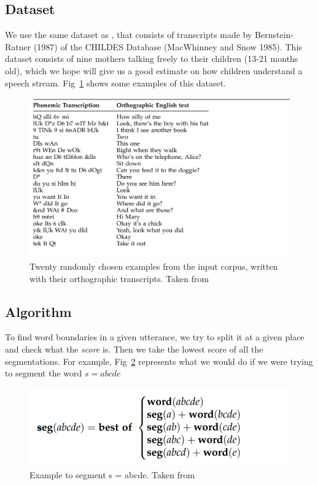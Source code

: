 \documentclass{article}
\begin{document}
\subsection{Dataset}
We use the same dataset as \citet{Brent}, that consists of transcripts made by Bernstein-Ratner (1987) of the CHILDES Database (MacWhinney and Snow 1985). This dataset consists of nine mothers talking freely to their children (13-21 months old), which we hope will give us a good estimate on how children understand a speech stream. Fig~\ref{fig:fig8} shows some examples of this dataset.
\begin{figure}[h!]
    \centering
    \includegraphics[scale=0.8]{figures/venkataram_corpus_example.PNG}
    \caption{Twenty randomly chosen examples from the input corpus, written with their orthographic transcripts. Taken from \citet{Venkataraman}}
    \label{fig:fig8}
\end{figure}
\subsection{Algorithm}
To find word boundaries in a given utterance, we try to split it at a given place and check what the \textit{score} is. Then we take the lowest score of all the segmentations.  For example, Fig~\ref{fig:fig9} represents what we would do if we were trying to segment the word $s = abcde$

\begin{figure}[h]
    \centering
    \includegraphics[scale=0.8]{figures/venkataram_seg_example.PNG}
    \caption{Example to segment s = abcde. Taken from \citet{Venkataraman}}
    \label{fig:fig9}
\end{figure}
\end{document}
